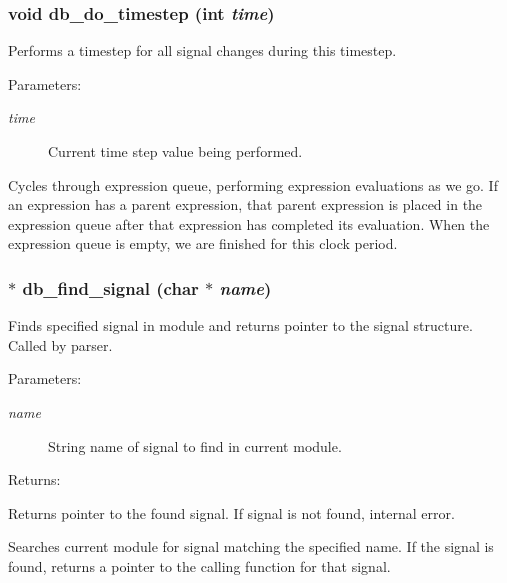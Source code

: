 \subsubsection{\setlength{\rightskip}{0pt plus 5cm}void db\_\-do\_\-timestep (int {\em time})}\label{db_8h_a20}


Performs a timestep for all signal changes during this timestep.

\begin{Desc}
\item[Parameters: ]\par
\begin{description}
\item[{\em 
time}]Current time step value being performed.\end{description}
\end{Desc}
Cycles through expression queue, performing expression evaluations as we go. If an expression has a parent expression, that parent expression is placed in the expression queue after that expression has completed its evaluation. When the expression queue is empty, we are finished for this clock period. 
\subsubsection{$\ast$ db\_\-find\_\-signal (char $\ast$ {\em name})}\label{db_8h_a7}


Finds specified signal in module and returns pointer to the signal structure. Called by parser.

\begin{Desc}
\item[Parameters: ]\par
\begin{description}
\item[{\em 
name}]String name of signal to find in current module.\end{description}
\end{Desc}
\begin{Desc}
\item[Returns: ]\par
Returns pointer to the found signal. If signal is not found, internal error.\end{Desc}
Searches current module for signal matching the specified name. If the signal is found, returns a pointer to the calling function for that signal. 
